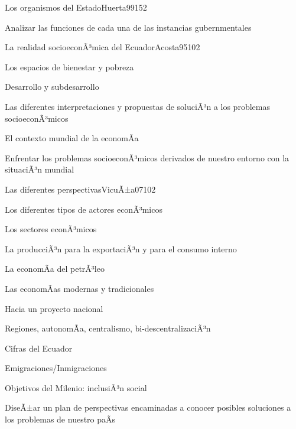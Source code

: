 \begin{syllabus}
\begin{unit}{Los organismos del Estado}{Huerta99}{15}{2}
   \begin{unitgoals}
      \item Analizar las funciones de cada una de las instancias gubernmentales
   \end{unitgoals}
\end{unit}

\begin{unit}{La realidad socioeconÃ³mica del Ecuador}{Acosta95}{10}{2}
   \begin{topics}
      \item Los espacios de bienestar y pobreza
	\item Desarrollo y subdesarrollo
	\item Las diferentes interpretaciones y propuestas de soluciÃ³n a los problemas socioeconÃ³micos
	\item El contexto mundial de la economÃ­a
   \end{topics}

   \begin{unitgoals}
      \item Enfrentar los problemas socioeconÃ³micos derivados de nuestro entorno con la situaciÃ³n mundial
   \end{unitgoals}
\end{unit}

\begin{unit}{Las diferentes perspectivas}{VicuÃ±a07}{10}{2}
   \begin{topics}
      \item Los diferentes tipos de actores econÃ³micos
	\item Los sectores econÃ³micos
	\item La producciÃ³n para la exportaciÃ³n y para el consumo interno
	\item La economÃ­a del petrÃ³leo
	\item Las economÃ­as modernas y tradicionales
	\item Hacia un proyecto nacional
	\item Regiones, autonomÃ­a, centralismo, bi-descentralizaciÃ³n
	\item Cifras del Ecuador
	\item Emigraciones/Inmigraciones
	\item Objetivos del Milenio: inclusiÃ³n social 
   \end{topics}

   \begin{unitgoals}
      \item DiseÃ±ar un plan de perspectivas encaminadas a conocer posibles soluciones a los problemas de nuestro paÃ­s
   \end{unitgoals}
\end{unit}

\begin{coursebibliography}
\end{coursebibliography}
\end{syllabus}
